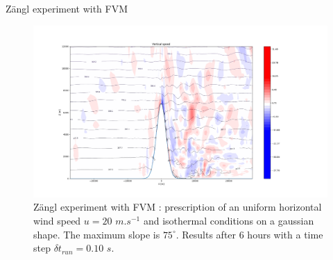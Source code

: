 \documentclass{beamer}
\begin{document}
\begin{frame}{Zängl experiment with FVM}
    \begin{figure}
        \centering
        \includegraphics[scale=0.2]{png/zangl_isothermal.png}
        \caption{Zängl experiment with FVM : prescription of an uniform horizontal wind 
        speed $u = 20$ $m.s^{-1}$ and isothermal conditions on a gaussian shape. The maximum slope 
        is $75^{\circ}$. Results after 6 hours with a time step $\delta t_{run} = 0.10$ $s$.  }
        \label{fig:zangl}
    \end{figure}

\end{frame}
\end{document}
